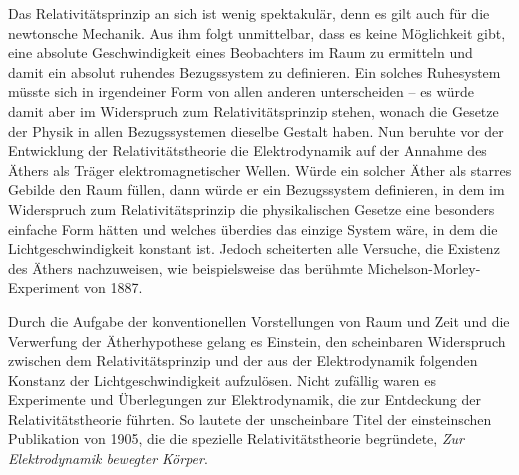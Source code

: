 \begin{nohyphens}
Das Relativitätsprinzip an sich ist wenig spektakulär, denn es gilt auch für die newtonsche Mechanik. Aus ihm folgt unmittelbar, dass es keine Möglichkeit gibt, eine absolute Geschwindigkeit eines Beobachters im Raum zu ermitteln und damit ein absolut ruhendes Bezugssystem zu definieren. Ein solches Ruhesystem müsste sich in irgendeiner Form von allen anderen unterscheiden – es würde damit aber im Widerspruch zum Relativitätsprinzip stehen, wonach die Gesetze der Physik in allen Bezugssystemen dieselbe Gestalt haben. Nun beruhte vor der Entwicklung der Relativitätstheorie die Elektrodynamik auf der Annahme des Äthers als Träger elektromagnetischer Wellen. Würde ein solcher Äther als starres Gebilde den Raum füllen, dann würde er ein Bezugssystem definieren, in dem im Widerspruch zum Relativitätsprinzip die physikalischen Gesetze eine besonders einfache Form hätten und welches überdies das einzige System wäre, in dem die Lichtgeschwindigkeit konstant ist. Jedoch scheiterten alle Versuche, die Existenz des Äthers nachzuweisen, wie beispielsweise das berühmte Michelson-Morley-Experiment von 1887.

Durch die Aufgabe der konventionellen Vorstellungen von Raum und Zeit und die Verwerfung der Ätherhypothese gelang es Einstein, den scheinbaren Widerspruch zwischen dem Relativitätsprinzip und der aus der Elektrodynamik folgenden Konstanz der Lichtgeschwindigkeit aufzulösen. Nicht zufällig waren es Experimente und Überlegungen zur Elektrodynamik, die zur Entdeckung der Relativitätstheorie führten. So lautete der unscheinbare Titel der einsteinschen Publikation von 1905, die die spezielle Relativitätstheorie begründete, \textit{Zur Elektrodynamik bewegter Körper}.

\end{nohyphens}

